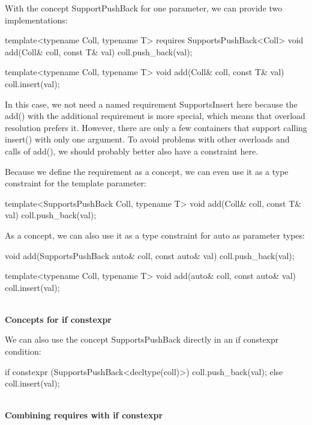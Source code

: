 With the concept SupportPushBack for one parameter, we can provide two implementations:

\begin{cpp}
template<typename Coll, typename T>
requires SupportsPushBack<Coll>
void add(Coll& coll, const T& val)
{
	coll.push_back(val);
}

template<typename Coll, typename T>
void add(Coll& coll, const T& val)
{
	coll.insert(val);
}
\end{cpp}

In this case, we not need a named requirement SupportsInsert here because the add() with the additional requirement is more special, which means that overload resolution prefers it. However, there are only a few containers that support calling insert() with only one argument. To avoid problems with other overloads and calls of add(), we should probably better also have a constraint here.

Because we define the requirement as a concept, we can even use it as a type constraint for the template parameter:

\begin{cpp}
template<SupportsPushBack Coll, typename T>
void add(Coll& coll, const T& val)
{
	coll.push_back(val);
}
\end{cpp}

As a concept, we can also use it as a type constraint for auto as parameter types:

\begin{cpp}
void add(SupportsPushBack auto& coll, const auto& val)
{
	coll.push_back(val);
}

template<typename Coll, typename T>
void add(auto& coll, const auto& val)
{
	coll.insert(val);
}
\end{cpp}

\noindent
\hspace*{\fill} \\ %
\textbf{Concepts for if constexpr}

We can also use the concept SupportsPushBack directly in an if constexpr condition:

\begin{cpp}
if constexpr (SupportsPushBack<decltype(coll)>) {
	coll.push_back(val);
}
else {
	coll.insert(val);
}
\end{cpp}

\noindent
\hspace*{\fill} \\ %
\textbf{Combining requires with if constexpr}

